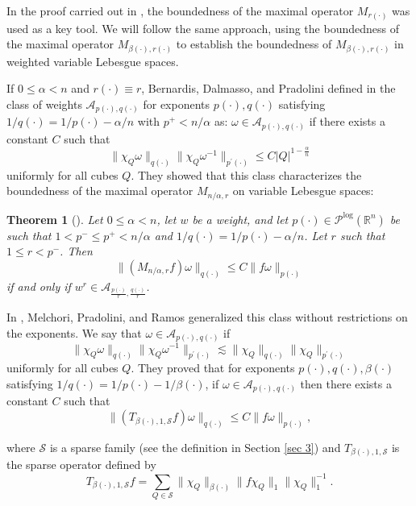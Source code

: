 \documentclass[a4paper,11pt,reqno]{amsart}
\theoremstyle{plain}
\numberwithin{equation}{section}
\newtheorem{teo}{Theorem}[section]
\theoremstyle{definition}
\newcommand{\R}{{\mathbb{R}^n}}
\begin{document}
In the proof carried out in \cite{C-U Diening Hasto}, the boundedness of the maximal operator $M_{r(\cdot)}$ was used as a key tool. We will follow the same approach, using the boundedness of the maximal operator $M_{\beta(\cdot),r(\cdot)}$ to establish the boundedness of $M_{\beta(\cdot),r(\cdot)}$ in weighted variable Lebesgue spaces.	


If $0\leq \alpha<n$ and $r(\cdot)\equiv r$, Bernardis, Dalmasso, and Pradolini defined in \cite{pesos Apq 2014} the class of weights $\mathcal{A}_{p(\cdot),q(\cdot)}$ for exponents $p(\cdot),q(\cdot)$ satisfying $1/q(\cdot)=1/p(\cdot)-\alpha/n$ with $p^+<n/\alpha$ as: $\omega\in \mathcal{A}_{p(\cdot),q(\cdot)}$ if there exists a constant $C$ such that
$$\|\chi_Q\omega\|_{q(\cdot)}\|\chi_Q\omega^{-1}\|_{p^\prime(\cdot)}\leq C|Q|^{1-\frac{\alpha}{n}}$$
uniformly for all cubes $Q$. They showed that this class characterizes the boundedness of the maximal operator $M_{n/\alpha,r}$ on variable Lebesgue spaces:
\begin{teo}[\cite{pesos Apq 2014}]
	Let $0 \leq \alpha < n$, let $w$ be a weight, and let $p(\cdot)\in\mathcal{P}^{\text{log}}(\R)$ be such that 
	$1 < p^- \le p^+ < n/\alpha$ and
	$1/q(\cdot) = 1/p(\cdot)-\alpha/n$.	Let $r$ such that 
	$1 \leq r < p^-$. 
	Then
	$$\|(M_{n/\alpha,r}f)\omega\|_{q(\cdot)}\leq C\|f\omega\|_{p(\cdot)}$$
	if and only if 
	$w^{r} \in \mathcal{A}_{\frac{p(\cdot)}{r}, \frac{q(\cdot)}{r}}$.
\end{teo}

In \cite{pesos Apq 2019}, Melchori, Pradolini, and Ramos generalized this class without restrictions on the exponents. We say that $\omega \in \mathcal{A}_{p(\cdot),q(\cdot)}$ if 
$$\|\chi_Q \omega\|_{q(\cdot)}\|\chi_Q \omega^{-1}\|_{p^\prime(\cdot)}\lesssim\|\chi_Q \|_{q(\cdot)}\|\chi_Q \|_{p^\prime(\cdot)}$$
uniformly for all cubes $Q$. They proved that for exponents $p(\cdot),q(\cdot),\beta(\cdot)$ satisfying $1/q(\cdot)=1/p(\cdot)-1/\beta(\cdot)$, if $\omega\in\mathcal{A}_{p(\cdot),q(\cdot)}$ then there exists a constant $C$ such that 
\begin{equation*}
	\|(T_{\beta(\cdot),1,\mathcal{S}}f)\omega\|_{q(\cdot)}\leq C\|f\omega\|_{p(\cdot)},	
\end{equation*}


where $\mathcal{S}$ is a sparse family (see the definition in Section \ref{sec 3}) and $T_{\beta(\cdot),1,\mathcal{S}}$ is the sparse operator defined by
$$T_{\beta(\cdot),1,\mathcal{S}}f=\sum_{Q\in \mathcal{S}}\|\chi_Q\|_{\beta(\cdot)}\|f\chi_Q\|_1 \|\chi_Q\|^{-1}_1.$$
\end{document}

